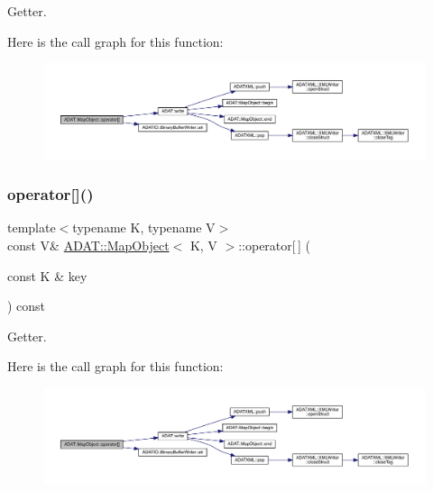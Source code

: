Getter. 

Here is the call graph for this function\+:
\nopagebreak
\begin{figure}[H]
\begin{center}
\leavevmode
\includegraphics[width=350pt]{da/d29/classADAT_1_1MapObject_adb014dc7d3ef80a73fd1734e818eeef4_cgraph}
\end{center}
\end{figure}
\mbox{\label{classADAT_1_1MapObject_adb014dc7d3ef80a73fd1734e818eeef4}} 
\subsubsection{\texorpdfstring{operator[]()}{operator[]()}\hspace{0.1cm}{\footnotesize\ttfamily [3/6]}}
{\footnotesize\ttfamily template$<$typename K, typename V$>$ \\
const V\& \mbox{\hyperlink{classADAT_1_1MapObject}{A\+D\+A\+T\+::\+Map\+Object}}$<$ K, V $>$\+::operator\mbox{[}$\,$\mbox{]} (\begin{DoxyParamCaption}\item[{const K \&}]{key }\end{DoxyParamCaption}) const\hspace{0.3cm}{\ttfamily [inline]}}



Getter. 

Here is the call graph for this function\+:
\nopagebreak
\begin{figure}[H]
\begin{center}
\leavevmode
\includegraphics[width=350pt]{da/d29/classADAT_1_1MapObject_adb014dc7d3ef80a73fd1734e818eeef4_cgraph}
\end{center}
\end{figure}
\mbox{\label{classADAT_1_1MapObject_ab6ac0d8eccffc7975fd329649dd6f9e7}} 
